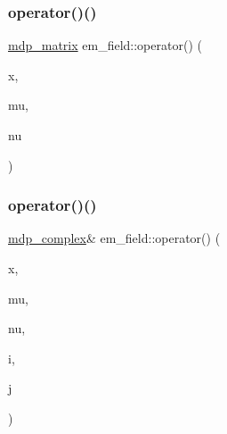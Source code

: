 \mbox{\label{classem__field_a4afce0ed26593545c4a61892880823bc}} 
\subsubsection{\texorpdfstring{operator()()}{operator()()}\hspace{0.1cm}{\footnotesize\ttfamily [1/3]}}
{\footnotesize\ttfamily \hyperlink{classmdp__matrix}{mdp\+\_\+matrix} em\+\_\+field\+::operator() (\begin{DoxyParamCaption}\item[{\hyperlink{mdp__compatibility__macros_8h_aa6f1179c424e48adef1cedf7c436eb75}{site}}]{x,  }\item[{int}]{mu,  }\item[{int}]{nu }\end{DoxyParamCaption})\hspace{0.3cm}{\ttfamily [inline]}}

\mbox{\label{classem__field_ab5063637e3b890ae95ea46b8458c6fc7}} 
\subsubsection{\texorpdfstring{operator()()}{operator()()}\hspace{0.1cm}{\footnotesize\ttfamily [2/3]}}
{\footnotesize\ttfamily \hyperlink{classmdp__complex}{mdp\+\_\+complex}\& em\+\_\+field\+::operator() (\begin{DoxyParamCaption}\item[{\hyperlink{mdp__compatibility__macros_8h_aa6f1179c424e48adef1cedf7c436eb75}{site}}]{x,  }\item[{int}]{mu,  }\item[{int}]{nu,  }\item[{int}]{i,  }\item[{int}]{j }\end{DoxyParamCaption})\hspace{0.3cm}{\ttfamily [inline]}}

\mbox{\label{classem__field_a49ee971ae0309c066c39e967f5d000d1}} 
